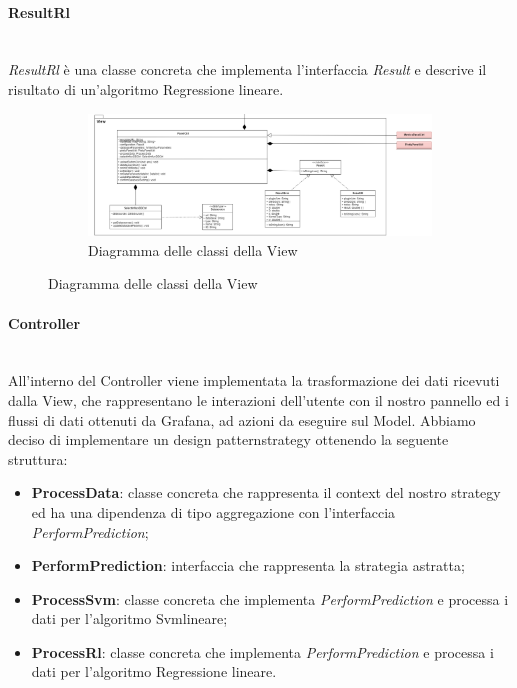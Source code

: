 \paragraph*{ResultRl} \mbox{}\\ [1mm]
\textit{ResultRl} è una classe concreta che implementa l'interfaccia \textit{Result} e descrive il risultato di un'algoritmo Regressione lineare\glo.
\mbox{}
\begin{landscape}
	\begin{figure}
		\begin{figure} [H]
			\includegraphics[width=\linewidth]{./img/Diagrammi/view-plug-in.png}
			\caption{Diagramma delle classi della View}
		\end{figure}
	\end{figure}
\end{landscape}

\paragraph{Controller} \mbox{}\\ [1mm]
All'interno del Controller viene implementata la trasformazione dei dati ricevuti dalla View, che rappresentano le interazioni dell'utente con il nostro pannello ed i flussi di dati ottenuti da Grafana\glo, ad azioni da eseguire sul Model.
Abbiamo deciso di implementare un design pattern\glosp strategy ottenendo la seguente struttura:
\begin{itemize}
	\item \textbf{ProcessData}: classe concreta che rappresenta il context del nostro strategy ed ha una dipendenza di tipo aggregazione con l'interfaccia \textit{PerformPrediction};
	\item \textbf{PerformPrediction}: interfaccia che rappresenta la strategia astratta;
	\item \textbf{ProcessSvm}: classe concreta che implementa \textit{PerformPrediction} e processa i dati per l'algoritmo Svm\glosp lineare;
	\item \textbf{ProcessRl}: classe concreta che implementa \textit{PerformPrediction} e processa i dati per l'algoritmo Regressione lineare\glo.
\end{itemize}


